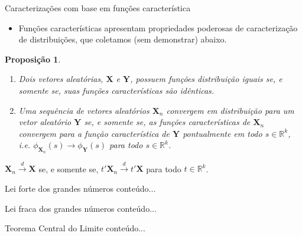 \documentclass[11pt]{beamer}
\newtheorem{proposition}{Proposição}
\begin{document}
	\begin{frame}{Caracterizações com base em funções característica}
		\begin{itemize}
			\item Funções características apresentam propriedades poderosas de caracterização de distribuições, que coletamos (sem demonstrar) abaixo.
		\end{itemize}
		\begin{proposition}
		\begin{enumerate}
			\item Dois vetores aleatórias, $\boldsymbol{X}$ e $\boldsymbol{Y}$, possuem funções distribuição iguais se, e somente se, suas funções características são idênticas.
			\item Uma sequência de vetores aleatórios $\boldsymbol{X}_n$ convergem em distribuição para um vetor aleatório $\boldsymbol{Y}$ se, e somente se, as funções características de $\boldsymbol{X}_n$ convergem para a função característica de $\boldsymbol{Y}$ pontualmente em todo $s \in \mathbb{R}^k$, i.e. $\phi_{\boldsymbol{X}_n}(s) \to \phi_{\boldsymbol{Y}}(s)$ para todo $s \in \mathbb{R}^k$. 
		\end{enumerate}
		\end{proposition}
		\begin{corollary}
			$\boldsymbol{X}_n \overset{d}{\to} \boldsymbol{X}$ se, e somente se, $t'\boldsymbol{X}_n  \overset{d}{\to} t'\boldsymbol{X}$ para todo $t \in \mathbb{R}^k$.
		\end{corollary}
	\end{frame}
	
	\begin{frame}{Lei forte dos grandes números}
		conteúdo...
	\end{frame}
	
		\begin{frame}{Lei fraca dos grandes números}
		conteúdo...
	\end{frame}
		\begin{frame}{Teorema Central do Limite}
		conteúdo...
	\end{frame}
\end{document}
